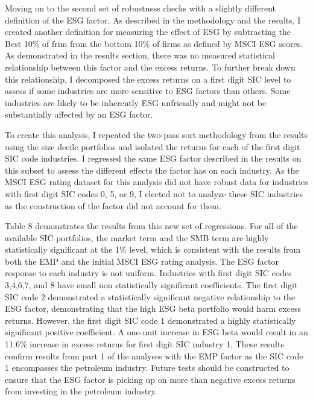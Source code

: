  
 Moving on to the second set of robustness checks with a slightly different definition of the ESG factor.  As described in the methodology and the results, I created another definition for measuring the effect of ESG by subtracting the Best 10\% of frim from the bottom 10\% of firms as defined by MSCI ESG scores. As demonstrated in the results section, there was no measured statistical relationship between this factor and the excess returns. To further break down this relationship, I decomposed the excess returns on a first digit SIC level to assess if some industries are more sensitive to ESG factors than others. Some industries are likely to be inherently ESG unfriendly and might not be substantially affected by an ESG factor. 

To create this analysis, I repeated the two-pass sort methodology from the results using the size decile portfolios and isolated the returns for each of the first digit SIC code industries.  I regressed the same ESG factor described in the results on this subset to assess the different effects the factor has on each industry. As the MSCI ESG rating dataset for this analysis did not have robust data for industries with first digit SIC codes 0, 5, or 9, I elected not to analyze these SIC industries as the construction of the factor did not account for them. 

Table 8 demonstrates the results from this new set of regressions. For all of the available  SIC portfolios, the market term and the SMB term are highly statistically significant at the 1\% level, which is consistent with the results from both the EMP and the initial MSCI ESG rating analysis. The ESG factor response to each industry is not uniform. Industries with first digit SIC codes 3,4,6,7, and 8 have small non statistically significant coefficients.  The first digit SIC code 2 demonstrated a statistically significant negative relationship to the ESG factor, demonstrating that the high ESG beta portfolio would harm excess returns. However, the first digit SIC code 1 demonstrated a highly statistically significant positive coefficient.  A one-unit increase in ESG beta would result in an 11.6\% increase in excess returns for first digit SIC industry 1. These results confirm results from part 1 of the analyses with the EMP factor as the SIC code 1 encompasses the petroleum industry. Future tests should be constructed to ensure that the ESG factor is picking up on more than negative excess returns from investing in the petroleum industry. 

